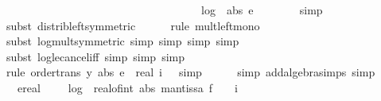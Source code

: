 \begin{isabellebody}
\ \ \ \ \ \ \ \ \ \ \ \ \ \ \ \ \ \ \ \ \ \ \ \ \ \ \ \ \ \ \ \ \ \ \ \ log\ {}\ {\isacharparenleft}{\kern0pt}abs\ e\ {\isacharplus}{\kern0pt}\ {}{\isacharparenright}{\kern0pt}{\isacharparenright}{\kern0pt}{\isacharparenright}{\kern0pt}{\isachardoublequoteclose}\isanewline
\ \ \ \ \isamarkupfalse%
\ {\isacharparenleft}{\kern0pt}simp{\isacharparenright}{\kern0pt}\isanewline
\ \ \ \ \isamarkupfalse%
\ {\isacharparenleft}{\kern0pt}subst\ distrib{\isacharunderscore}{\kern0pt}left{\isacharbrackleft}{\kern0pt}symmetric{\isacharbrackright}{\kern0pt}{\isacharparenright}{\kern0pt}\isanewline
\ \ \ \ \isamarkupfalse%
\ {\isacharparenleft}{\kern0pt}rule\ mult{\isacharunderscore}{\kern0pt}left{\isacharunderscore}{\kern0pt}mono{\isacharparenright}{\kern0pt}\isanewline
\ \ \ \ \ \isamarkupfalse%
\ {\isacharparenleft}{\kern0pt}subst\ log{\isacharunderscore}{\kern0pt}mult{\isacharbrackleft}{\kern0pt}symmetric{\isacharbrackright}{\kern0pt}{\isacharcomma}{\kern0pt}\ simp{\isacharcomma}{\kern0pt}\ simp{\isacharcomma}{\kern0pt}\ simp{\isacharcomma}{\kern0pt}\ simp{\isacharparenright}{\kern0pt}\isanewline
\ \ \ \ \ \isamarkupfalse%
\ {\isacharparenleft}{\kern0pt}subst\ log{\isacharunderscore}{\kern0pt}le{\isacharunderscore}{\kern0pt}cancel{\isacharunderscore}{\kern0pt}iff{\isacharcomma}{\kern0pt}\ simp{\isacharcomma}{\kern0pt}\ simp{\isacharcomma}{\kern0pt}\ simp{\isacharparenright}{\kern0pt}\isanewline
\ \ \ \ \isamarkupfalse%
\ {\isacharparenleft}{\kern0pt}rule\ order{\isacharunderscore}{\kern0pt}trans{\isacharbrackleft}{\kern0pt}\ y{\isacharequal}{\kern0pt}{\isachardoublequoteopen}\ abs\ e\ {\isacharplus}{\kern0pt}\ real\ i\ {\isacharplus}{\kern0pt}\ {}{\isachardoublequoteclose}{\isacharbrackright}{\kern0pt}{\isacharcomma}{\kern0pt}\ simp{\isacharparenright}{\kern0pt}\isanewline
\ \ \ \ \isamarkupfalse%
\ {\isacharparenleft}{\kern0pt}simp\ add{\isacharcolon}{\kern0pt}algebra{\isacharunderscore}{\kern0pt}simps{\isacharcomma}{\kern0pt}\ simp{\isacharparenright}{\kern0pt}\isanewline
\ \ \isamarkupfalse%
\ \isamarkupfalse%
\ {\isachardoublequoteopen}{\isachardot}{\kern0pt}{\isachardot}{\kern0pt}{\isachardot}{\kern0pt}\ {\isasymle}\ ereal\ {\isacharparenleft}{\kern0pt}{}\ {\isacharplus}{\kern0pt}\ {}\ {\isacharasterisk}{\kern0pt}\ {\isacharparenleft}{\kern0pt}log\ {}\ {\isacharparenleft}{\kern0pt}real{\isacharunderscore}{\kern0pt}of{\isacharunderscore}{\kern0pt}int\ {\isacharparenleft}{\kern0pt}abs\ {\isacharparenleft}{\kern0pt}mantissa\ f\ {\isacharasterisk}{\kern0pt}\ {}\ {\isacharcircum}{\kern0pt}\ i{\isacharparenright}{\kern0pt}{\isacharparenright}{\kern0pt}\ {\isacharplus}{\kern0pt}\ {}{\isacharparenright}{\kern0pt}\ {\isacharplus}{\kern0pt}\isanewline

\end{isabellebody}
